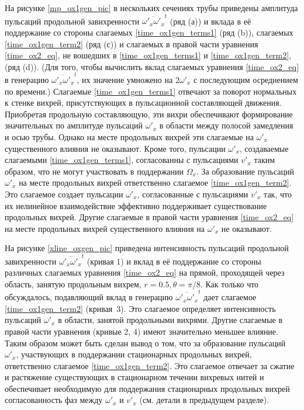 На рисунке \ref{mp_ox1gen_pic} в нескольких сечениях трубы приведены амплитуда пульсаций продольной завихренности $\overline{\omega'_x \omega'_x}^t$ (ряд (а)) и вклада в её поддержание со стороны слагаемых \eqref{time_ox1gen_terms1} (ряд (b)), слагаемых \eqref{time_ox1gen_term2} (ряд (с)) и слагаемых в правой части уравнения \eqref{time_ox2_eq}, не вошедших в \eqref{time_ox1gen_terms1} и \eqref{time_ox1gen_term2}, (ряд (d)). (Для того, чтобы вычислить вклад слагаемых уравнения \eqref{time_ox2_eq} в генерацию $\overline{\omega'_x \omega'_x}^t$, их значение умножено на $2\omega'_x$ с последующим осреднением по времени.) Слагаемые \eqref{time_ox1gen_terms1} отвечают за поворот нормальных к стенке вихрей, присутствующих в пульсационной составляющей движения. Приобретая продольную составляющую, эти вихри обеспечивают формирование значительных по амплитуде пульсаций $\omega'_x$ в области между полосой замедления и осью трубы. Однако на месте продольных вихрей эти слагаемые на $\omega'_x$ существенного влияния не оказывают. Кроме того, пульсации $\omega'_x$, создаваемые слагаемыми \eqref{time_ox1gen_terms1}, согласованны с пульсациями $v'_x$ таким образом, что не могут участвовать в поддержании $\Omega_x$. За образование пульсаций $\omega'_x$ на месте продольных вихрей ответственно слагаемое \eqref{time_ox1gen_term2}. Это слагаемое создает пульсации $\omega'_x$, согласованные с пульсациями $v'_x$ так, что их нелинейное взаимодействие эффективно поддерживает существование продольных вихрей. Другие слагаемые в правой части уравнения \eqref{time_ox2_eq} на месте продольных вихрей существенного влияния на $\omega'_x$ не оказывают. 


На рисунке \ref{xline_oxgen_pic} приведена интенсивность пульсаций продольной завихренности $\overline{\omega'_x \omega'_x}^t$ (кривая 1) и вклад в её поддержание со стороны различных слагаемых уравнения \eqref{time_ox2_eq} на прямой, проходящей через область, занятую продольным вихрем, $r = 0.5, \theta = \pi/8$. Как только что обсуждалось, подавляющий вклад в генерацию $\overline{\omega'_x \omega'_x}^t$ дает слагаемое \eqref{time_ox1gen_term2} (кривая~3). Это слагаемое определяет интенсивность пульсаций $\omega'_x$ в области, занятой продольными вихрями. Другие слагаемые в правой части уравнения (кривые 2, 4) имеют значительно меньшее влияние. Таким образом может быть сделан вывод о том, что за образование пульсаций $\omega'_x$, участвующих в поддержании стационарных продольных вихрей, ответственно слагаемое \eqref{time_ox1gen_term2}. Это слагаемое отвечает за сжатие и растяжение существующих в стационарном течении вихревых нитей и обеспечивает необходимую для поддержания стационарных продольных вихрей согласованность фаз между $\omega'_x$ и $v'_x$ (см. детали в предыдущем разделе). 

